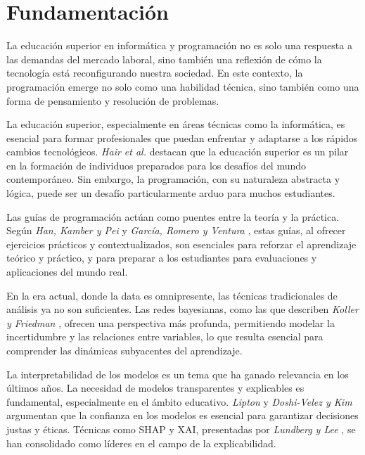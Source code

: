 \hypertarget{Fundamentación}{%
\section{Fundamentación}\label{Fundamentación}}

La educación superior en informática y programación no es solo una respuesta a las demandas del mercado laboral, sino también una reflexión de cómo la tecnología está reconfigurando nuestra sociedad. En este contexto, la programación emerge no solo como una habilidad técnica, sino también como una forma de pensamiento y resolución de problemas.

La educación superior, especialmente en áreas técnicas como la informática, es esencial para formar profesionales que puedan enfrentar y adaptarse a los rápidos cambios tecnológicos. \textit{Hair et al.} \cite{hair2019advanced} destacan que la educación superior es un pilar en la formación de individuos preparados para los desafíos del mundo contemporáneo. Sin embargo, la programación, con su naturaleza abstracta y lógica, puede ser un desafío particularmente arduo para muchos estudiantes.

Las guías de programación actúan como puentes entre la teoría y la práctica. Según \textit{Han, Kamber y Pei} \cite{han2011data} y \textit{García, Romero y Ventura} \cite{garcia2018prediccion}, estas guías, al ofrecer ejercicios prácticos y contextualizados, son esenciales para reforzar el aprendizaje teórico y práctico, y para preparar a los estudiantes para evaluaciones y aplicaciones del mundo real.

En la era actual, donde la data es omnipresente, las técnicas tradicionales de análisis ya no son suficientes. Las redes bayesianas, como las que describen \textit{Koller y Friedman} \cite{koller2009introduction}, ofrecen una perspectiva más profunda, permitiendo modelar la incertidumbre y las relaciones entre variables, lo que resulta esencial para comprender las dinámicas subyacentes del aprendizaje.

La interpretabilidad de los modelos es un tema que ha ganado relevancia en los últimos años. La necesidad de modelos transparentes y explicables es fundamental, especialmente en el ámbito educativo. \textit{Lipton} \cite{lipton2018mythos} y \textit{Doshi-Velez y Kim} \cite{doshivelez2017rigorous} argumentan que la confianza en los modelos es esencial para garantizar decisiones justas y éticas. Técnicas como SHAP y XAI, presentadas por \textit{Lundberg y Lee} \cite{lundberg2017unified}, se han consolidado como líderes en el campo de la explicabilidad.

